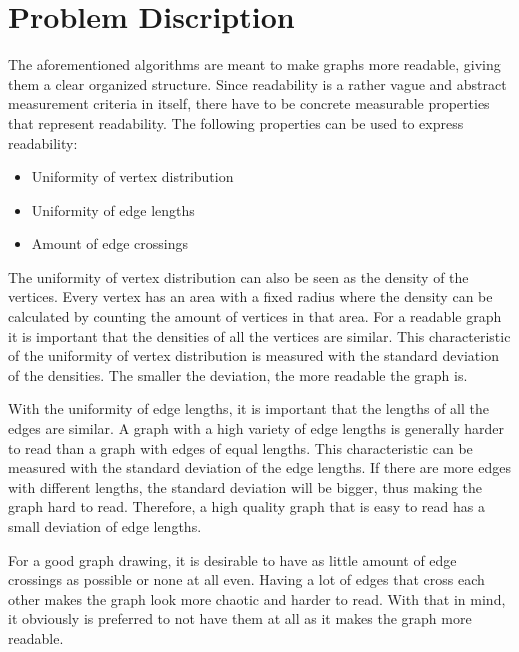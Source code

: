 \documentclass[a4paper,12pt]{article}
\begin{document}
  \section{Problem Discription}
    The aforementioned algorithms are meant to make graphs more readable, giving them a clear organized structure.
    Since readability is a rather vague and abstract measurement criteria in itself, there have to be concrete measurable properties that represent readability.
    The following properties can be used to express readability: \cite{kobourov2012spring}
    \begin{itemize}
      \item Uniformity of vertex distribution
      \item Uniformity of edge lengths
      \item Amount of edge crossings
    \end{itemize}
    The uniformity of vertex distribution can also be seen as the density of the vertices.
    Every vertex has an area with a fixed radius where the density can be calculated by counting the amount of vertices in that area.
    For a readable graph it is important that the densities of all the vertices are similar.
    This characteristic of the uniformity of vertex distribution is measured with the standard deviation of the densities.
    The smaller the deviation, the more readable the graph is.

    With the uniformity of edge lengths, it is important that the lengths of all the edges are similar.
    A graph with a high variety of edge lengths is generally harder to read than a graph with edges of equal lengths.
    This characteristic can be measured with the standard deviation of the edge lengths.
    If there are more edges with different lengths, the standard deviation will be bigger, thus making the graph hard to read.
    Therefore, a high quality graph that is easy to read has a small deviation of edge lengths.

    For a good graph drawing, it is desirable to have as little amount of edge crossings as possible or none at all even.
    Having a lot of edges that cross each other makes the graph look more chaotic and harder to read.
    With that in mind, it obviously is preferred to not have them at all as it makes the graph more readable.
\end{document}
